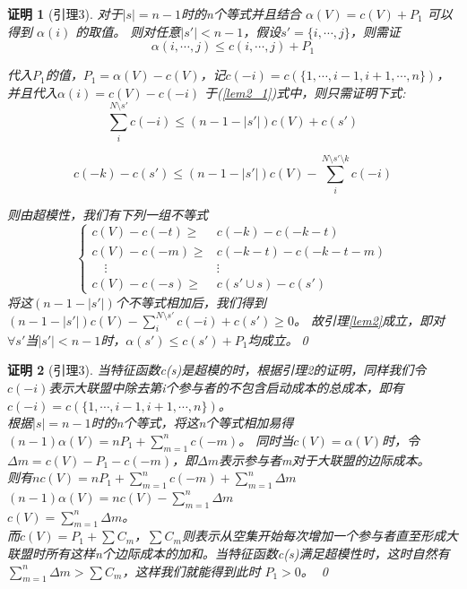 \documentclass[UTF8]{article}
\newtheorem{pf}{\hspace{2em}证明}
\begin{document}
\begin{pf}[引理3]

对于$\left| s \right|= n-1 $时的n个等式并且结合 $\alpha(V)=c(V)+P_1$ 可以得到 $\alpha(i)$ 的取值。
则对任意$\left| s' \right| < n-1$，假设$s'=\{i,\cdots,j\}$，则需证
\begin{equation} \label{lem2_1}
  \alpha(i,\cdots,j) \leq c(i,\cdots,j)+P_1
\end{equation}

代入$P_1$的值，$P_1=\alpha(V)-c(V)$，记$c(-i)=c(\{1,\cdots,i-1,i+1,\cdots,n\})$，并且代入$\alpha(i) = c(V)-c(-i)$ 于(\ref{lem2_1})式中，则只需证明下式:
\begin{equation}   \label{lem2_2}
  \sum_i^{N\setminus s'} c(-i) \leq (n-1-\left| s' \right|)c(V)+c(s')
\end{equation}

\Rightarrow \qquad

\begin{equation*}
  c(-k)-c(s') \leq (n-1-\left| s' \right|)c(V)-\sum_i^{N\setminus s'\setminus k} c(-i)
\end{equation*}

则由超模性，我们有下列一组不等式
\[
\begin{cases}
  c(V)-c(-t) \geq & c(-k)-c(-k-t) \\
  c(V)-c(-m) \geq & c(-k-t)-c(-k-t-m) \\
 \quad   \vdots        &\vdots\\
 c(V)-c(-s) \geq & c(s' \cup s)-c(s')
\end{cases}
\]
将这$(n-1-\left| s' \right|)$个不等式相加后，我们得到
$(n-1-\left| s' \right|)c(V)- \sum_i^{N\setminus s'} c(-i)+c(s') \geq 0 $。
故引理\ref{lem2}成立，即对$\forall s'$当$\left|s' \right|<n-1$时，$\alpha(s') \leq c(s')+P_1$均成立。\qed
\end{pf}


\begin{pf}[引理3]

当特征函数c(s)是超模的时，根据引理2的证明，同样我们令$c(-i)$表示大联盟中除去第i个参与者的不包含启动成本的总成本，即有$c(-i)=c(\{1,\cdots,i-1,i+1,\cdots,n\})$。\\
根据$\left| s \right|= n-1 $时的n个等式，将这n个等式相加易得$(n-1)\alpha(V)=nP_1+ \sum_{m=1}^n c(-m)$。
同时当$c(V)=\alpha(V)$时，令$\Delta m=c(V)-P_1-c(-m)$，即$\Delta m$表示参与者m对于大联盟的边际成本。\\
则有$nc(V)=nP_1+\sum_{m=1}^n c(-m) +\sum_{m=1}^n \Delta m$ \\
\Rightarrow  \qquad  $(n-1)\alpha(V)=nc(V)-\sum_{m=1}^n \Delta m$ \\
\Rightarrow   \qquad  $c(V)= \sum_{m=1}^n \Delta m$。 \\
而$c(V)=P_1+\sum C_m$，$\sum C_m $则表示从空集开始每次增加一个参与者直至形成大联盟时所有这样n个边际成本的加和。当特征函数c(s)满足超模性时，这时自然有$\sum_{m=1}^n \Delta m > \sum C_m$，这样我们就能得到此时 $P_1 > 0$。
\qed
\end{pf}
\end{document}
